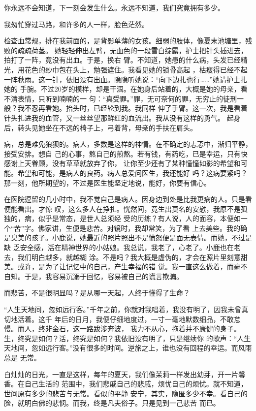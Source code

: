 \documentclass[12pt,a4paper]{article}
\begin{document}
		你永远不会知道，下一刻会发生什么。永远不知道，我们究竟拥有多少。

		我匆忙穿过马路，和许多的人一样，脸色茫然。

		检查血常规，排在我前面的，是背影单薄的女孩。细弱的肢体，像夏末池塘里，残败的疏疏荷茎。
	她轻轻伸出左臂，无血色的一段雪白绽露，护士把针头插进去，拍打了一阵，竟没有出血。于是，换右
	臂。不知道，她患的什么病，头发已经精光，用花色的纱巾包在头上，勉强遮住。我看见她的锁骨高起
	，枯瘦得已经不起一阵秋雨。这一针，依旧没有出血。隐隐听她说：“向下边扎也行……”她请护士扎她的
	手腕。不过20岁的模样，却是干涸。在她身后站着的，大概是她的母亲，看不清表情，只听到喃喃的一
	句：“真受罪。”罪，无可奈何的罪，无穷止的徒刑一般？我不忍再看她。抬头时，已经轮到我。我同样
	伸了手臂。这一次，我是看着针头扎进我的血管，又一丝丝望那鲜红的血流出。我从没有这样的勇气。
	起身后，转头见她坐在不远的椅子上，弓着背，母亲的手扶在肩头。

		病，总是难免狼狈的。病人，多数是这样的神情。在不确定的忐忑中，渐归平静，接受安排。想自
	己的心事，熬自己的煎熬。若有钱，有药吃，已是幸运，只有快感谢上天眷顾，没有草草就放弃了你，
	让你至少还有了某种憧憧如影的希望和可能。希望和可能，是病人的良药。病人总爱问医生，我还能好
	吗？这病要紧吗？那一刻，他所期望的，不过是医生能坚定地说，能好，你要有信心。

		在医院逗留的几小时中，我不觉自己是病人。因身边到处是比我更病的人。只是看便能看出。才惊
	叹，这么多人在挣扎。恍然间，竟生出莫名的安慰，我原不是孤独的，病，似乎是常态，是世人总须经
	受的历练？有人说，人的面容，本便如一个“苦”字。佛家讲，生便是悲苦。对镜时，我却常笑，为了看
	上去美些。我的确是臭美的孩子。小鹿说，她最近的照片照出不是愤怒便是面无表情。而她，不过是缺
	乏安全感，活在精神世界的小姑娘。我总说，我老了，心老了。小鹿也在老去，我们明白越多，就越糊
	涂。不是吗？我大概是虚伪的，才会在照片里刻意甜美。或许，是为了让记忆中的自己，产生幸福的错
	觉。我一直这么做着，而毫不自知。于是，我容易沉溺于回忆，容易被自己的谎言欺骗。

		而悲苦，不是很明显吗？是从哪一天起，人终于懂得了生命？

		“人生天地间，忽如远行客。”千年之前，你就对我唱着，我没有明了，因我未曾真切地活着。这千
	年后的日月，我便仔细地度过，一寸一毫地默数细品，不敢怠慢。而人，终非金石，这一路跋涉奔波，
	我力不从心，拖着并不康健的身子。生，终究是如何？活，终究是如何？我依旧没有明了，只是继续你
	的歌声：“人生天地间，忽如远行客。”没有很多的时间。逆旅之上，谁也没有回程的幸运。而风雨总是
	无常。

		白灿灿的日光，一直是这样，每年的夏天，我们像茉莉一样发出幼芽，开一片馨香。在自己生活的
	范围中，我们悲戚自己的悲戚，烦忧自己的烦忧。就不知道，世间原有多少的悲苦与无常。看似的平静
	安宁，其实，隐匿多少不幸。看自己的脸，就明白佛的悲悯。而我，终是凡夫俗子。只是见到一己悲苦
	而已。
\end{document}
